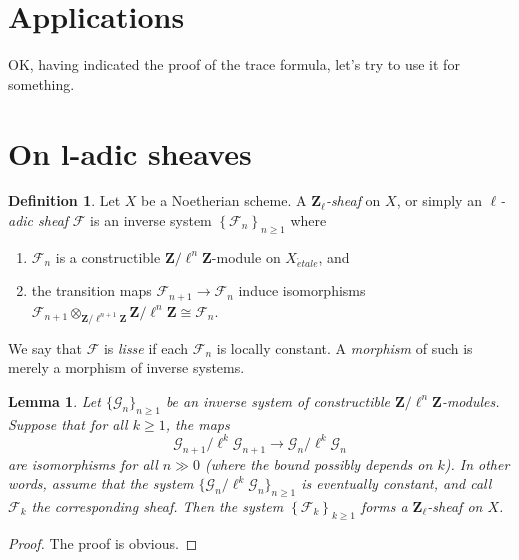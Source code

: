 \documentclass{stacks-project}
\theoremstyle{plain}
\newtheorem{lemma}[subsection]{Lemma}
\theoremstyle{definition}
\newtheorem{definition}[subsection]{Definition}
\theoremstyle{remark}
\numberwithin{equation}{subsection}
\def\etale{{\acute{e}tale}}
\begin{document}
\section{Applications}
\label{section-applications}

\noindent
OK, having indicated the proof of the trace formula, let's try to use it
for something.





\section{On l-adic sheaves}
\label{section-l-adic-sheaves}

\begin{definition}
\label{definition-l-adic-sheaf}
Let $X$ be a Noetherian scheme. A {\it $\mathbf{Z}_\ell$-sheaf} on $X$, or
simply an {\it $\ell$-adic sheaf} $\mathcal{F}$ is an
inverse system $\left\{\mathcal{F}_n\right\}_{n\geq 1}$ where
\begin{enumerate}
\item
$\mathcal{F}_n$ is a constructible $\mathbf{Z}/\ell^n\mathbf{Z}$-module on
$X_\etale$, and
\item
the transition maps $\mathcal{F}_{n+1}\to \mathcal{F}_n$ induce isomorphisms
$\mathcal{F}_{n+1} \otimes_{\mathbf{Z}/\ell^{n+1}\mathbf{Z}}
\mathbf{Z}/\ell^n\mathbf{Z} \cong \mathcal{F}_n$.
\end{enumerate}
We say that $\mathcal{F}$ is {\it lisse} if each $\mathcal{F}_n$ is locally
constant. A {\it morphism} of such is merely a morphism of inverse systems.
\end{definition}

\begin{lemma}
\label{lemma-eventually-constant}
Let $\{\mathcal{G}_n\}_{n\geq 1}$ be an inverse system of constructible
$\mathbf{Z}/\ell^n\mathbf{Z}$-modules.
Suppose that for all $k\geq 1$, the maps
$$
\mathcal{G}_{n+1}/\ell^k \mathcal{G}_{n+1}\to \mathcal{G}_n /\ell^k
\mathcal{G}_n
$$
are isomorphisms for all $n\gg 0$ (where the bound possibly depends on $k$).
In other words, assume that the system
$\{\mathcal{G}_n/\ell^k\mathcal{G}_n\}_{n\geq 1}$
is eventually constant, and call $\mathcal{F}_k$ the corresponding sheaf.
Then the system $\left\{\mathcal{F}_k\right\}_{k\geq 1}$ forms a
$\mathbf{Z}_\ell$-sheaf on $X$.
\end{lemma}

\begin{proof}
The proof is obvious.
\end{proof}
\end{document}
